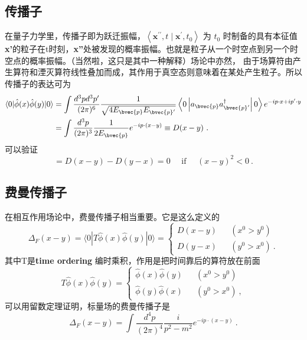 \subsection{传播子}
在量子力学里，传播子即为跃迁振幅，$\left\langle\mathbf{x}^{\prime \prime}, t \mid \mathbf{x}^{\prime}, t_{0}\right\rangle$ 为 $t_0$ 时制备的具有本征值\textbf{x'}的粒子在t时刻，\textbf{x''}处被发现的概率振幅。也就是粒子从一个时空点到另一个时空点的概率振幅。（当然啦，这只是其中一种解释）场论中亦然，
由于场算符由产生算符和湮灭算符线性叠加而成，其作用于真空态则意味着在某处产生粒子。所以传播子的表达可为
$$\begin{aligned}\langle 0|\hat{\phi}(x) \hat{\phi}(y)| 0\rangle &=\int \frac{d^{3} p d^{3} p^{\prime}}{(2 \pi)^{6}} \frac{1}{\sqrt{4 E_{\bvec{p}} E_{\bvec{p}^{\prime}}}}\left\langle 0\left|a_{\bvec{p}} a_{\bvec{p}^{\prime}}^{\dagger}\right| 0\right\rangle e^{-i p \cdot x+i p^{\prime} \cdot y} \\ &=\int \frac{d^{3} p}{(2 \pi)^{3}} \frac{1}{2 E_{\bvec{p}}} e^{-i p \cdot(x-y)} \equiv D(x-y) ~.\end{aligned}$$
可以验证
\begin{equation}
[\hat{\phi}(x), \hat{\phi}(y)]=D(x-y)-D(y-x)=0 \quad \text { if } \quad(x-y)^{2}<0~.
\end{equation}

\subsection{费曼传播子}
在相互作用场论中，费曼传播子相当重要。它是这么定义的
\begin{equation}
\Delta_{F}(x-y)=\langle 0|T \hat{\phi}(x) \hat{\phi}(y)| 0\rangle=\left\{\begin{array}{ll}
D(x-y) && (x^{0}>y^{0}) \\
D(y-x) && (y^{0}>x^{0})~.
\end{array}\right.
\end{equation}
其中T是\textbf{time ordering} 编时乘积，作用是把时间靠后的算符放在前面
\begin{equation}
T \hat{\phi}(x) \hat{\phi}(y)=\left\{\begin{array}{ll}
\hat{\phi}(x) \hat{\phi}(y) && (x^{0}>y^{0}) \\
\hat{\phi}(y) \hat{\phi}(x) && (y^{0}>x^{0})~,
\end{array}\right.
\end{equation}
可以用留数定理证明，标量场的费曼传播子是
\begin{equation}
\Delta_{F}(x-y)=\int \frac{d^{4} p}{(2 \pi)^{4}} \frac{i}{p^{2}-m^{2}} e^{-i p \cdot(x-y)}~.
\end{equation}

